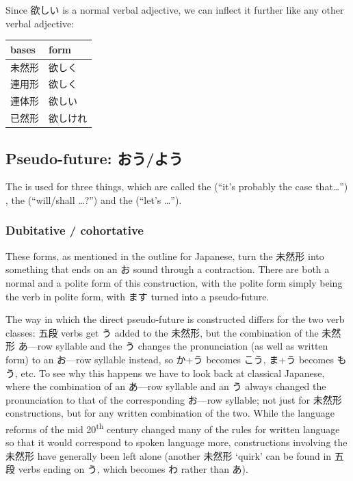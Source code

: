 \documentclass[11pt, b5paper, twoside, openright, onecolumn]{book}
\newenvironment{mytabular}[1]{\noindent\hspace{0.4in}
\begin{tabular}[h]{#1}}{\end{tabular}}
\begin{document}
Since 欲しい is a normal verbal adjective‚ we can inflect it further like any other verbal adjective:

\vspace{0.5cm}
\smaller
\begin{mytabular}{| l  l |}\hline 
\rule{0pt}{2.4ex}bases & form\\ 
\hline
\rule{0pt}{2.4ex}未然形 & 欲しく\\ 
\rule{0pt}{2.4ex}連用形 & 欲しく\\ 
\rule{0pt}{2.4ex}連体形 & 欲しい\\ 
\rule{0pt}{2.4ex}已然形 & 欲しけれ\\ 
\hline 
\end{mytabular}
\larger
\subsection{Pseudo-future: おう/よう}


The  is used for three things‚ which are called the  (“it’s probably the case that…”)‚ the  (“will/shall …?”) and the  (“let’s …”).
\subsubsection{Dubitative / cohortative}

These forms‚ as mentioned in the outline for Japanese‚ turn the 未然形 into something that ends on an お sound through a contraction. There are both a normal and a polite form of this construction‚ with the polite form simply being the verb in polite form‚ with ます turned into a pseudo-future.

The way in which the direct pseudo-future is constructed differs for the two verb classes: 五段 verbs get う added to the 未然形‚ but the combination of the 未然形 あ—row syllable and the う changes the pronunciation (as well as written form) to an お—row syllable instead‚ so か+う becomes こう‚ ま+う becomes もう‚ etc. To see why this happens we have to look back at classical Japanese‚ where the combination of an あ—row syllable and an う always changed the pronunciation to that of the corresponding お—row syllable; not just for 未然形 constructions‚ but for any written combination of the two. While the language reforms of the mid 20\textsuperscript{th} century changed many of the rules for written language so that it would correspond to spoken language more‚ constructions involving the 未然形 have generally been left alone (another 未然形 ‘quirk’ can be found in 五段 verbs ending on う‚ which becomes わ rather than あ).
\end{document}
